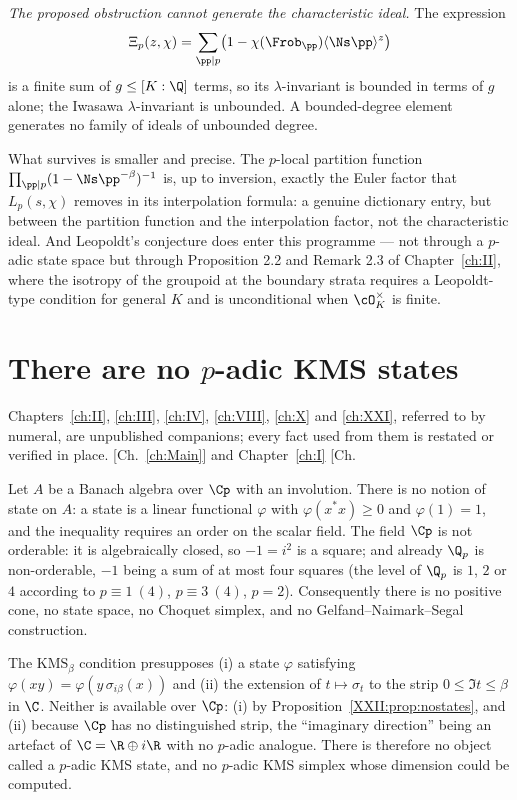 \begin{summary}
\emph{The proposed obstruction cannot generate the characteristic ideal.} The expression
\[
\Xi_p(z,\chi)=\sum_{\pp\mid p}\bigl(1-\chi(\Frob_\pp)\langle\Ns\pp\rangle^z\bigr)
\]
is a finite sum of $g\le[K:\Q]$ terms, so its $\lambda$-invariant is bounded in terms of $g$
alone; the Iwasawa
$\lambda$-invariant is unbounded. A bounded-degree element generates no family of ideals of
unbounded degree.

What survives is smaller and precise. The $p$-local partition function
$\prod_{\pp\mid p}(1-\Ns\pp^{-\beta})^{-1}$ is, up to inversion, exactly the Euler factor that
$L_p(s,\chi)$ removes in its interpolation formula: a genuine dictionary entry, but between
the partition function and the interpolation factor, not the characteristic ideal. And
Leopoldt's conjecture does enter this programme --- not through a $p$-adic state space but
through Proposition 2.2 and Remark 2.3 of Chapter~\ref{ch:II}, where the isotropy of the
groupoid at the boundary strata
requires a Leopoldt-type condition for general $K$ and is unconditional when $\cO_K^\times$
is finite.
\end{summary}


\section{There are no $p$-adic KMS states}

Chapters~\ref{ch:II}, \ref{ch:III}, \ref{ch:IV}, \ref{ch:VIII}, \ref{ch:X} and \ref{ch:XXI}, referred to by numeral, are unpublished
companions; every fact used from them is restated or verified in place. [Ch.~\ref{ch:Main}] and
Chapter~\ref{ch:I} [Ch.\begin{proposition}\label{XXII:prop:nostates}
Let $A$ be a Banach algebra over $\Cp$ with an involution. There is no notion of state on
$A$: a state is a linear functional $\varphi$ with $\varphi(x^*x)\ge0$ and $\varphi(1)=1$, and
the inequality requires an order on the scalar field. The field $\Cp$ is not orderable: it is
algebraically closed, so $-1=i^2$ is a square; and already $\Q_p$ is non-orderable, $-1$
being a sum of at most four squares (the level of $\Q_p$ is $1$, $2$ or $4$ according to
$p\equiv1\ (4)$, $p\equiv3\ (4)$, $p=2$). Consequently there is no positive cone, no state
space, no Choquet simplex, and no
Gelfand--Naimark--Segal construction.
\end{proposition}

\begin{corollary}\label{XXII:cor:noKMS}
The $\mathrm{KMS}_\beta$ condition presupposes (i) a state $\varphi$ satisfying
$\varphi(xy)=\varphi(y\,\sigma_{i\beta}(x))$ and (ii) the extension of $t\mapsto\sigma_t$ to
the strip $0\le\Im t\le\beta$ in $\C$. Neither is
available over $\Cp$: (i) by Proposition~\ref{XXII:prop:nostates}, and (ii) because $\Cp$ has no
distinguished strip, the ``imaginary direction'' being an artefact of $\C=\R\oplus i\R$ with
no $p$-adic analogue. There is therefore no object called a $p$-adic KMS state, and no
$p$-adic KMS simplex whose dimension could be computed.
\end{corollary}

